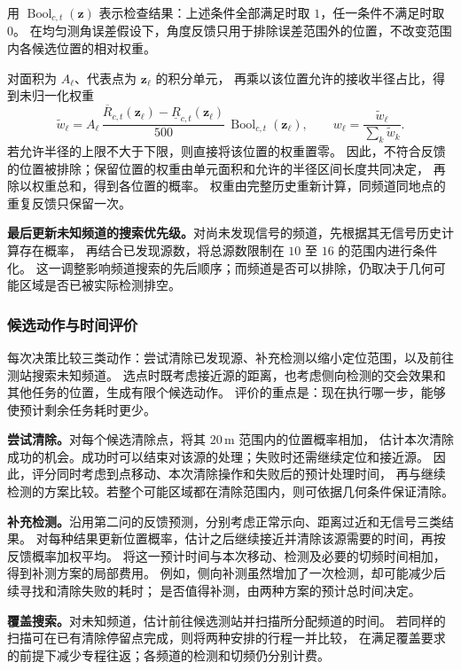 \documentclass[UTF8,a4paper,12pt]{ctexart}
\begin{document}
用 $\operatorname{Bool}_{c,t}(\boldsymbol z)$ 表示检查结果：上述条件全部满足时取 $1$，任一条件不满足时取 $0$。
在均匀测角误差假设下，角度反馈只用于排除误差范围外的位置，不改变范围内各候选位置的相对权重。

对面积为 $A_\ell$、代表点为 $\boldsymbol z_\ell$ 的积分单元，
再乘以该位置允许的接收半径占比，得到未归一化权重
\begin{equation}
  \widetilde w_\ell
  =A_\ell\,
    \frac{\overline R_{c,t}(\boldsymbol z_\ell)-\underline R_{c,t}(\boldsymbol z_\ell)}{500}
    \,\operatorname{Bool}_{c,t}(\boldsymbol z_\ell),
  \qquad w_\ell=\frac{\widetilde w_\ell}{\sum_k\widetilde w_k}.
  \label{eq:q3-position-weights}
\end{equation}
若允许半径的上限不大于下限，则直接将该位置的权重置零。
因此，不符合反馈的位置被排除；保留位置的权重由单元面积和允许的半径区间长度共同决定，
再除以权重总和，得到各位置的概率。
权重由完整历史重新计算，同频道同地点的重复反馈只保留一次。

\textbf{最后更新未知频道的搜索优先级。}对尚未发现信号的频道，先根据其无信号历史计算存在概率，
再结合已发现源数，将总源数限制在 $10$ 至 $16$ 的范围内进行条件化。
这一调整影响频道搜索的先后顺序；而频道是否可以排除，仍取决于几何可能区域是否已被实际检测排空。

\subsubsection{候选动作与时间评价}

每次决策比较三类动作：尝试清除已发现源、补充检测以缩小定位范围，以及前往测站搜索未知频道。
选点时既考虑接近源的距离，也考虑侧向检测的交会效果和其他任务的位置，生成有限个候选动作。
评价的重点是：现在执行哪一步，能够使预计剩余任务耗时更少。

\textbf{尝试清除。}对每个候选清除点，将其 $20\,\mathrm m$ 范围内的位置概率相加，
估计本次清除成功的机会。成功时可以结束对该源的处理；失败时还需继续定位和接近源。
因此，评分同时考虑到点移动、本次清除操作和失败后的预计处理时间，
再与继续检测的方案比较。若整个可能区域都在清除范围内，则可依据几何条件保证清除。

\textbf{补充检测。}沿用第二问的反馈预测，分别考虑正常示向、距离过近和无信号三类结果。
对每种结果更新位置概率，估计之后继续接近并清除该源需要的时间，再按反馈概率加权平均。
将这一预计时间与本次移动、检测及必要的切频时间相加，得到补测方案的局部费用。
例如，侧向补测虽然增加了一次检测，却可能减少后续寻找和清除失败的耗时；
是否值得补测，由两种方案的预计总时间决定。

\textbf{覆盖搜索。}对未知频道，估计前往候选测站并扫描所分配频道的时间。
若同样的扫描可在已有清除停留点完成，则将两种安排的行程一并比较，
在满足覆盖要求的前提下减少专程往返；各频道的检测和切频仍分别计费。
\end{document}
